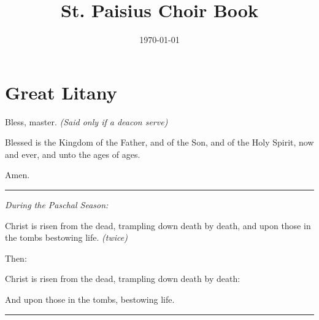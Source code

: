 \documentclass[14pt]{memoir}
\title{St. Paisius Choir Book}
\date{\today}
\providecommand\sbseries{\fontseries{sb}\selectfont}
\newcommand{\priest}{\mdseries \item[\textsb{Priest}]}
\newcommand{\deacon}{\mdseries \item[\textsb{Deacon}]}
\newcommand{\choir}{\normalfont\sbseries \item[\textsb{\textsc{Choir}}]}
\newcommand{\clergy}{\mdseries \item[\textsb{Clergy}]}
\newcommand{\rubric}[1]{
    {\color{Red1}\itshape{#1}}
}
\newenvironment{rubricsection}{
    {\color{Red1} \rule{\linewidth}{0.5mm}}
    }
    {
    {\color{Red1} \rule{\linewidth}{0.5mm}}
}
\newenvironment{liturgicaltext}{
    \begin{description}[labelwidth=4em,leftmargin =\dimexpr\labelwidth+\labelsep\relax]
    }
    {
    \end{description}
}
\newenvironment{rubricmed}{
    \begin{Center}
        \color{Red1}\itshape
    }
    {
    \end{Center}
    }
\begin{document}
\section{Great Litany}

\begin{liturgicaltext}
    \deacon Bless, master. \rubric{(Said only if a deacon serve)}
    \priest Blessed is the Kingdom of the Father, and of the Son, and of the Holy Spirit, now and ever, and unto the ages of ages.
    \choir Amen.
\end{liturgicaltext}

\begin{rubricsection}
    \begin{rubricmed}
        \rubric{During the Paschal Season:}
    \end{rubricmed}
    \begin{liturgicaltext}
        \clergy Christ is risen from the dead, trampling down death by death, and upon those in the tombs bestowing life. \rubric{(twice)}
    \end{liturgicaltext}
    \begin{rubricmed}
        Then:
    \end{rubricmed}
    \begin{liturgicaltext}
        \clergy Christ is risen from the dead, trampling down death by death:
        \choir And upon those in the tombs, bestowing life.
    \end{liturgicaltext}

\end{rubricsection}
\end{document}
